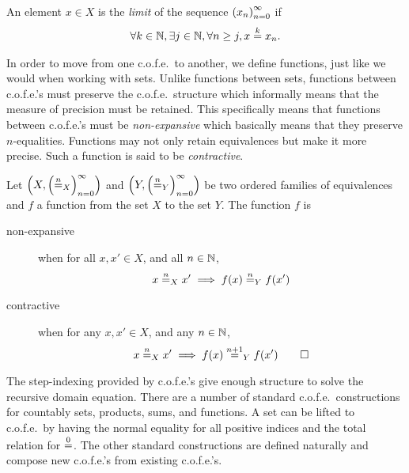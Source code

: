 \begin{jversion}
\begin{definition}
  An element $x \in X$ is the \emph{limit} of the sequence $\seq{x}$ if
  \begin{align*}
    \forall k \in \nats, \exists j \in \nats, \forall n \geq j, x \nequal[k] x_n.
  \end{align*}
\end{definition}
In order to move from one c.o.f.e.\ to another, we define functions, just like we would when working with sets.
Unlike functions between sets, functions between c.o.f.e.'s must preserve the c.o.f.e.\ structure which informally means that the measure of precision must be retained.
This specifically means that functions between c.o.f.e.'s must be \emph{non-expansive} which basically means that they preserve $n$-equalities.
Functions may not only retain equivalences but make it more precise.
Such a function is said to be \emph{contractive}.
\begin{definition}
  \label{def:nonexpansive-contractive-ofe}
  Let $\left(X,\left(\nequal[n]_X\right)_{n=0}^{\infty} \right)$ and $\left(Y,\left(\nequal[n]_Y\right)_{n=0}^{\infty} \right)$ be two ordered families of equivalences and $f$ a function from the set $X$ to the set $Y$.
  The function $f$ is
  \begin{description}
  \item[non-expansive] when for all $x, x' \in X$, and all $n \in \nats$,
\[
  x \nequal_X x' \implies f(x) \nequal_Y f(x')
\]
  \item[contractive] when for any $x, x' \in X$, and any $n \in \nats$,
\[
  x \nequal_X x' \implies f(x) \nequal[n+1]_Y f(x') 
  \qedhere
\]
  \end{description}
\end{definition}
\noindent The step-indexing provided by c.o.f.e.'s give enough structure to solve the recursive domain equation.
There are a number of standard c.o.f.e.\ constructions for countably sets, products, sums, and functions.
A set can be lifted to c.o.f.e.\ by having the normal equality for all positive indices and the total relation for $\nequal[0]$.
The other standard constructions are defined naturally and compose new c.o.f.e.'s from existing c.o.f.e.'s.


\end{jversion}
